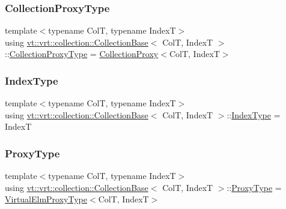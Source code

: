 \subsubsection{\texorpdfstring{Collection\+Proxy\+Type}{CollectionProxyType}}
{\footnotesize\ttfamily template$<$typename ColT, typename IndexT$>$ \\
using \hyperlink{structvt_1_1vrt_1_1collection_1_1_collection_base}{vt\+::vrt\+::collection\+::\+Collection\+Base}$<$ ColT, IndexT $>$\+::\hyperlink{structvt_1_1vrt_1_1collection_1_1_collection_base_af40b40a2ee128748bcb917f14a0152b4}{Collection\+Proxy\+Type} =  \hyperlink{structvt_1_1vrt_1_1collection_1_1_collection_proxy}{Collection\+Proxy}$<$ColT, IndexT$>$}

\mbox{\label{structvt_1_1vrt_1_1collection_1_1_collection_base_ac1fbcd7655ac53ee681964cee23c5d1e}} 
\subsubsection{\texorpdfstring{Index\+Type}{IndexType}}
{\footnotesize\ttfamily template$<$typename ColT, typename IndexT$>$ \\
using \hyperlink{structvt_1_1vrt_1_1collection_1_1_collection_base}{vt\+::vrt\+::collection\+::\+Collection\+Base}$<$ ColT, IndexT $>$\+::\hyperlink{structvt_1_1vrt_1_1collection_1_1_collection_base_ac1fbcd7655ac53ee681964cee23c5d1e}{Index\+Type} =  IndexT}

\mbox{\label{structvt_1_1vrt_1_1collection_1_1_collection_base_a0c2fd2443732bebc963f6278b7ba089b}} 
\subsubsection{\texorpdfstring{Proxy\+Type}{ProxyType}}
{\footnotesize\ttfamily template$<$typename ColT, typename IndexT$>$ \\
using \hyperlink{structvt_1_1vrt_1_1collection_1_1_collection_base}{vt\+::vrt\+::collection\+::\+Collection\+Base}$<$ ColT, IndexT $>$\+::\hyperlink{structvt_1_1vrt_1_1collection_1_1_collection_base_a0c2fd2443732bebc963f6278b7ba089b}{Proxy\+Type} =  \hyperlink{namespacevt_1_1vrt_a620a5c8c59d13e513f690c74b4af516f}{Virtual\+Elm\+Proxy\+Type}$<$ColT, IndexT$>$}



